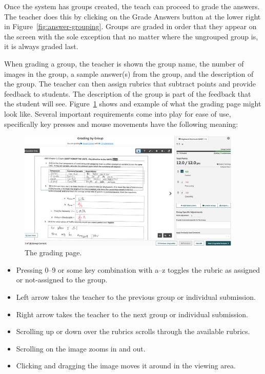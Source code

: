 \documentclass[ms,twoside,print]{nuthesis}
\begin{document}
Once the system has groups created, the teach can proceed to grade the answers. The teacher does this by clicking on the Grade Answers button at the lower right in Figure~\ref{fig:answer-grouping}. Groups are graded in order that they appear on the screen with the sole exception that no matter where the ungrouped group is, it is always graded last. 

When grading a group, the teacher is shown the group name, the number of images in the group, a sample answer(s) from the group, and the description of the group. The teacher can then assign rubrics that subtract points and provide feedback to students. The description of the group is part of the feedback that the student will see. Figure~\ref{fig:grading-answers} shows and example of what the grading page might look like. Several important requirements come into play for ease of use, specifically key presses and mouse movements have the following meaning:

\begin{figure}[htb]
    \centering
    \includegraphics[width=0.95\textwidth]{images/grading-answer.png}
    \caption{The grading page.}\label{fig:grading-answers}
\end{figure}

\begin{itemize}
    \item Pressing 0--9 or some key combination with a--z toggles the rubric as assigned or not-assigned to the group. 
    \item Left arrow takes the teacher to the previous group or individual submission.
    \item Right arrow takes the teacher to the next group or individual submission.
    \item Scrolling up or down over the rubrics scrolls through the available rubrics.
    \item Scrolling on the image zooms in and out.
    \item Clicking and dragging the image moves it around in the viewing area. 
\end{itemize}
\end{document}
